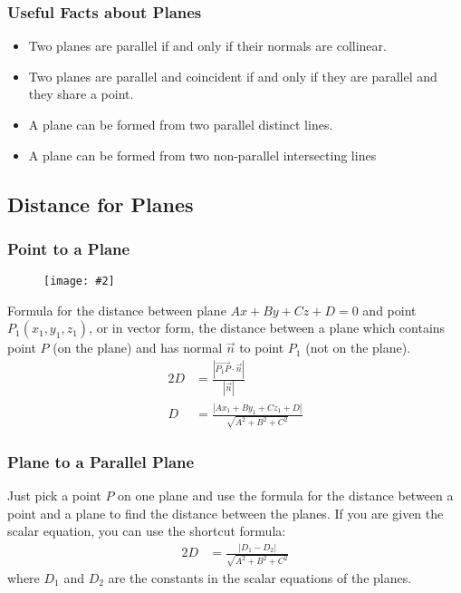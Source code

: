 \documentclass[letterpaper, 12pt]{report}
\newcommand\pv[1]{\overrightarrow{#1}}
\newcommand{\diagram}[2][0.5]{
	\begin{figure}[H]
		\centering
		\texttt{[image: \#2]}
	\end{figure}
	}
\theoremstyle{definition}
\numberwithin{equation}{section}
\begin{document}
\subsubsection{Useful Facts about Planes}
\begin{itemize}
	\item Two planes are parallel if and only if their normals are collinear.
	\item Two planes are parallel and coincident if and only if they are parallel and they share a point.
	\item A plane can be formed from two parallel distinct lines.
	\item A plane can be formed from two non-parallel intersecting lines
\end{itemize}


\subsection{Distance for Planes}

\subsubsection{Point to a Plane}
\diagram{distance-from-point-to-plane}
Formula for the distance between plane $Ax+By+Cz+D=0$ and point $P_1 (x_1,y_1,z_1)$, or in vector form, the distance between a plane which contains point $P$ (on the plane) and has normal $\vec n$ to point $P_1$ (not on the plane).
\begin{alignat}{2}{}
	D &= \frac{|\pv{P_1P}\cdot\vec n|}{|\vec n|} \\
	D &= \frac{|Ax_1+By_1+Cz_1+D|}{\sqrt{A^2+B^2+C^2}}
\end{alignat}

\subsubsection{Plane to a Parallel Plane}
Just pick a point $P$ on one plane and use the formula for the distance between a point and a plane to find the distance between the planes. If you are given the scalar equation, you can use the shortcut formula:
\begin{alignat}{2}{}
	D &= \frac{|D_1 - D_2|}{\sqrt{A^2+B^2+C^2}}
\end{alignat}
where $D_1$ and $D_2$ are the constants in the scalar equations of the planes.
\end{document}
